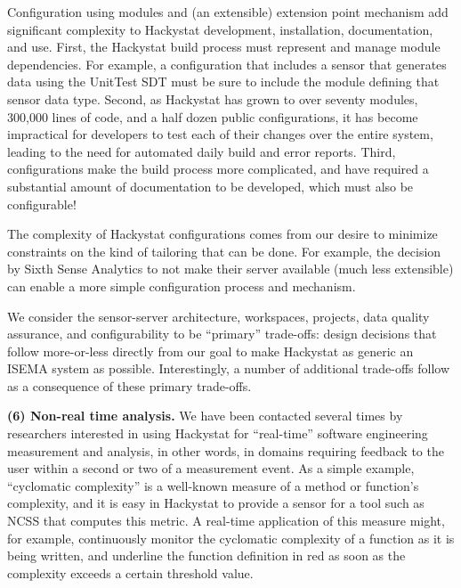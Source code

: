 \documentclass[10pt,twocolumn]{article}
\begin{document}
Configuration using modules and (an extensible) extension point mechanism
add significant complexity to Hackystat development, installation,
documentation, and use.  First, the Hackystat build process must represent
and manage module dependencies. For example, a configuration that includes
a sensor that generates data using the UnitTest SDT must be sure to include
the module defining that sensor data type.  Second, as Hackystat has grown
to over seventy modules, 300,000 lines of code, and a half dozen public 
configurations, it has become impractical for developers to test each of
their changes over the entire system, leading to the need for automated
daily build and error reports.  Third, configurations make the build
process more complicated, and have required a substantial amount of
documentation to be developed, which must also be configurable!

The complexity of Hackystat configurations comes from our desire to
minimize constraints on the kind of tailoring that can be done.  For
example, the decision by Sixth Sense Analytics to not make their server
available (much less extensible) can enable a more simple configuration
process and mechanism.


We consider the sensor-server architecture, workspaces, projects, data
quality assurance, and configurability to be ``primary'' trade-offs: design
decisions that follow more-or-less directly from our goal to make Hackystat
as generic an ISEMA system as possible.  Interestingly, a number of
additional trade-offs follow as a consequence of these primary trade-offs.

{\bf (6) Non-real time analysis.}  We have been contacted several times by
researchers interested in using Hackystat for ``real-time'' software
engineering measurement and analysis, in other words, in domains requiring
feedback to the user within a second or two of a measurement event.  As a
simple example, ``cyclomatic complexity'' is a well-known measure of a
method or function's complexity, and it is easy in Hackystat to provide a
sensor for a tool such as NCSS that computes this metric.  A real-time
application of this measure might, for example, continuously monitor the
cyclomatic complexity of a function as it is being written, and underline
the function definition in red as soon as the complexity exceeds a certain
threshold value.
\end{document}

